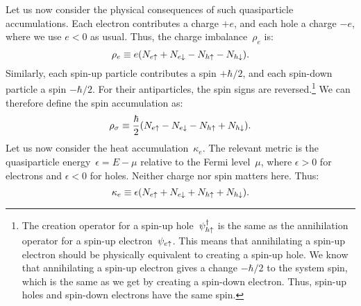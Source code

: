 Let us now consider the physical consequences of such quasiparticle accumulations.
Each electron contributes a charge $+e$, and each hole a charge $-e$, where we use $e<0$ as usual.
Thus, the charge imbalance~$\rho_e$ is:
\begin{equation}
  \rho_e \equiv e(N_{e\uparrow} + N_{e\downarrow} - N_{h\uparrow} - N_{h\downarrow}).
\end{equation}
Similarly, each spin-up particle contributes a spin $+\hbar/2$, and each spin-down particle a spin $-\hbar/2$.
For their antiparticles, the spin signs are reversed.\footnote{The creation operator for a spin-up hole~$\psi_{h\uparrow}^\dagger$ is the same as the annihilation operator for a spin-up electron~$\psi_{e\uparrow}$. This means that annihilating a spin-up electron should be physically equivalent to creating a spin-up hole. We know that annihilating a spin-up electron gives a change $-\hbar/2$ to the system spin, which is the same as we get by creating a spin-down electron. Thus, spin-up holes and spin-down electrons have the same spin.}
We can therefore define the spin accumulation as:
\begin{equation}
  \rho_\sigma \equiv \frac{\hbar}{2} (N_{e\uparrow} - N_{e\downarrow} - N_{h\uparrow} + N_{h\downarrow}).
\end{equation}
Let us now consider the heat accumulation~$\kappa_e$.
The relevant metric is the quasiparticle energy~$\epsilon = E - \mu$ relative to the Fermi level~$\mu$, where $\epsilon > 0$ for electrons and $\epsilon < 0$ for holes.
Neither charge nor spin matters here. Thus:
\begin{equation}
  \kappa_e \equiv \epsilon(N_{e\uparrow} + N_{e\downarrow} + N_{h\uparrow} + N_{h\downarrow}).
\end{equation}
